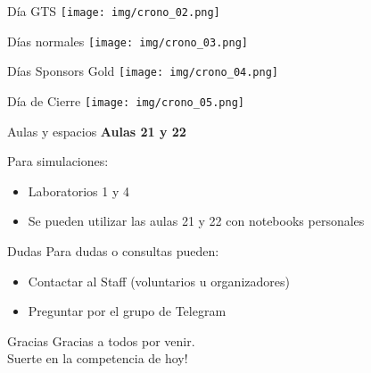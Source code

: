 \documentclass{beamer}
\begin{document}
\begin{frame}{Día GTS}
    \centering
    \texttt{[image: img/crono\_02.png]}
\end{frame}

\begin{frame}{Días normales}
    \centering
    \texttt{[image: img/crono\_03.png]}
\end{frame}

\begin{frame}{Días Sponsors Gold}
    \centering
    \texttt{[image: img/crono\_04.png]}
\end{frame}

\begin{frame}{Día de Cierre}
    \centering
    \texttt{[image: img/crono\_05.png]}
\end{frame}

\begin{frame}{Aulas y espacios}
    \centering
    {\bf Aulas 21 y 22}
    
    \vspace{1cm}
    
    Para simulaciones:
    \begin{itemize}
        \item Laboratorios 1 y 4
        \item Se pueden utilizar las aulas 21 y 22 con notebooks personales
    \end{itemize}
\end{frame}

\begin{frame}{Dudas}
Para dudas o consultas pueden:
        \begin{itemize}
            \item Contactar al Staff (voluntarios u organizadores)
            \item Preguntar por el grupo de Telegram
        \end{itemize}
\end{frame}

\begin{frame}{Gracias}
    \centering
    Gracias a todos por venir.\\
    Suerte en la competencia de hoy!
\end{frame}
\end{document}
